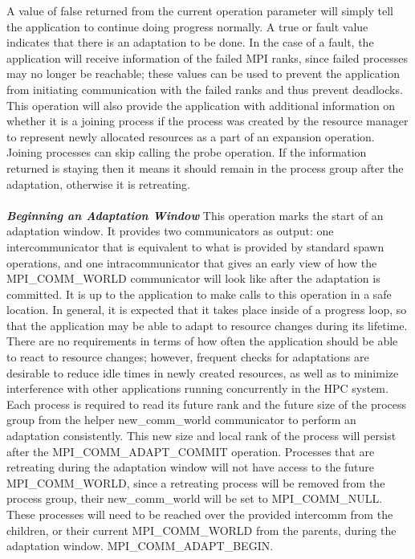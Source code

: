 A value of false returned from the current operation parameter will simply tell the application to continue doing progress normally. A true or fault value indicates that there is an adaptation to be done. In the case of a fault, the application will receive information of the failed MPI ranks, since failed processes may no longer be reachable; these values can be used to prevent the application from initiating communication with the failed  ranks and thus prevent deadlocks. This operation will also provide the application with additional information on whether it is a joining process if the process was created by the resource manager to represent newly allocated resources as a part of an expansion operation. Joining processes can skip calling the probe operation. If the information returned is staying then it means it should remain in the process group after the adaptation, otherwise it is retreating.\\ \\
\textbf{\textit{Beginning an Adaptation Window}} This operation marks the start of an adaptation window. It provides two communicators as output: one intercommunicator that is equivalent to what is provided by standard spawn operations, and one intracommunicator that gives an early view of how the MPI{\_}COMM{\_}WORLD communicator will look like after the adaptation is committed. It is up to the application to make calls to this operation in a safe location. In general, it is expected that it takes place inside of a progress loop, so that the application may be able to adapt to resource changes during its lifetime. There are no requirements in terms of how often the application should be able to react to resource changes; however, frequent checks for adaptations are desirable to reduce idle times in newly created resources, as well as to minimize interference with other applications running concurrently in the HPC system. Each process is required to read its future rank and the future  size of the process group from the helper new{\_}comm{\_}world communicator to perform an adaptation consistently. This new size and local rank of the process will persist after the MPI{\_}COMM{\_}ADAPT{\_}COMMIT operation. Processes that are retreating during the adaptation window will not have access to the future MPI{\_}COMM{\_}WORLD, since a retreating process will be removed from the process group, their new{\_}comm{\_}world will be set to MPI{\_}COMM{\_}NULL. These processes will need to be reached over the provided intercomm from the children, or their current MPI{\_}COMM{\_}WORLD from the parents, during the adaptation window. MPI{\_}COMM{\_}ADAPT{\_}BEGIN.
